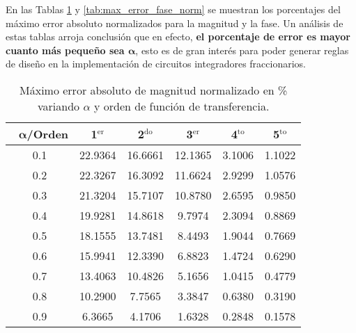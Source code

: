 	En las Tablas \ref{tab:max_error_mag_norm} y \ref{tab:max_error_fase_norm} se muestran los porcentajes del máximo error absoluto normalizados para la magnitud y la fase. Un análisis de estas tablas arroja conclusión que en efecto, \textbf{el porcentaje de error es mayor cuanto más pequeño sea $\bm{\alpha}$}, esto es de gran interés para poder generar reglas de diseño en la implementación de circuitos integradores fraccionarios.

	\begin{table}[!hbp]                                 
	\centering            
	\caption{Máximo error absoluto de magnitud normalizado en \% variando $\alpha$ y orden de función de transferencia.}                           
	\label{tab:max_error_mag_norm}                               
		\begin{tabular}{cccccc}
			\hline                                             
			$\,\,\,\,\bm{\alpha}$\textbf{/Orden} & \textbf{1$^{\mathrm{er}}$} & \textbf{2$^{\mathrm{do}}$} & \textbf{3$^{\mathrm{er}}$} & \textbf{4$^{\mathrm{to}}$} & \textbf{5$^{\mathrm{to}}$} \\                     
			\hline                                             
			0.1 & 22.9364 & 16.6661 & 12.1365 & 3.1006 & 1.1022 \\
			                                               
			0.2 & 22.3267 & 16.3092 & 11.6624 & 2.9299 & 1.0576 \\
			                                                
			0.3 & 21.3204 & 15.7107 & 10.8780 & 2.6595 & 0.9850 \\
			                                               
			0.4 & 19.9281 & 14.8618 & 9.7974 & 2.3094 & 0.8869 \\ 
			                                               
			0.5 & 18.1555 & 13.7481 & 8.4493 & 1.9044 & 0.7669 \\ 
			                                                
			0.6 & 15.9941 & 12.3390 & 6.8823 & 1.4724 & 0.6290 \\ 
			                                              
			0.7 & 13.4063 & 10.4826 & 5.1656 & 1.0415 & 0.4779 \\ 
			                                              
			0.8 & 10.2900 & 7.7565 & 3.3847 & 0.6380 & 0.3190 \\  
			                                             
			0.9 & 6.3665 & 4.1706 & 1.6328 & 0.2848 & 0.1578 \\  
			\hline                                             
		\end{tabular}                                                             
	\end{table}


